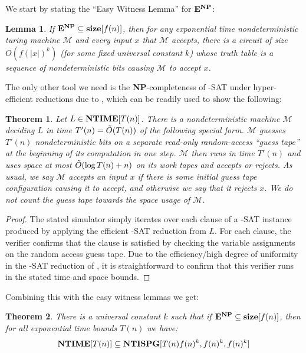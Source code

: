 \documentclass[11pt]{article}
\newtheorem{theorem}{Theorem}
\newtheorem{lemma}{Lemma}
\def\cl{\bf}
\begin{document}
We start by stating the ``Easy Witness Lemma'' for ${\cl E}^{\cl NP}$:
\begin{lemma}\cite{IKW}
If ${\cl E}^{\cl NP} \subseteq {\cl size}[f(n)]$, then for any exponential time nondeterministic turing machine $\mathcal{M}$ and every input $x$ that $\mathcal{M}$ accepts, there is a circuit of size $O(f(|x|)^k)$ (for some fixed universal constant $k$) whose truth table is a sequence of nondeterministic bits causing $\mathcal{M}$ to accept $x$.
\end{lemma}

The only other tool we need is the {\cl NP}-completeness of {-SAT} under hyper-efficient reductions due to \cite{tisp-sat}, which can be readily used to show the following:
\begin{theorem}\label{thm:3sat}
Let $L \in {\cl NTIME}[T(n)]$. There is a nondeterministic machine $\mathcal{M}$ deciding $L$ in time $T'(n) = \Tilde{O}(T(n))$ of the following special form. $\mathcal{M}$ guesses $T'(n)$ nondeterministic bits on a separate read-only random-access ``guess tape'' at the beginning of its computation in one step. $\mathcal{M}$ then runs in time $T'(n)$ and uses space at most $\Tilde{O}(\log T(n) + n)$ on its work tapes and accepts or rejects. As usual, we say $\mathcal{M}$ accepts an input $x$ if there is some initial guess tape configuration causing it to accept, and otherwise we say that it rejects $x$. We do not count the guess tape towards the space usage of $\mathcal{M}$. 
\end{theorem}
\begin{proof}
The stated simulator simply iterates over each clause of a {-SAT} instance produced by applying the efficient {-SAT} reduction from $L$. For each clause, the verifier confirms that the clause is satisfied by checking the variable assignments on the random access guess tape. Due to the efficiency/high degree of uniformity in the {-SAT} reduction of \cite{tisp-sat}, it is straightforward to confirm that this verifier runs in the stated time and space bounds.
\end{proof}
Combining this with the easy witness lemmas we get:
\begin{theorem}
There is a universal constant $k$ such that if ${\cl E}^{\cl NP} \subseteq {\cl size}[f(n)]$, then for all exponential time bounds $T(n)$ we have:
\[
{\cl NTIME}[T(n)] \subseteq {\cl NTISPG}[T(n)f(n)^k,f(n)^k, f(n)^k]
\]
\end{theorem}
\end{document}
